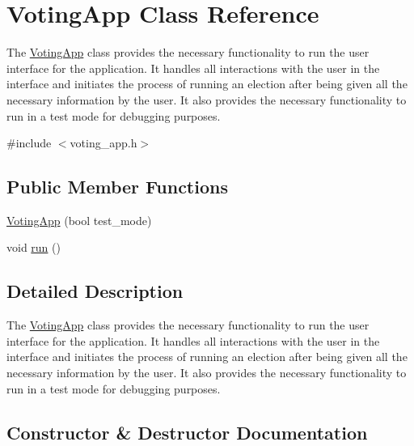\hypertarget{classVotingApp}{}\section{Voting\+App Class Reference}
\label{classVotingApp}


The \hyperlink{classVotingApp}{Voting\+App} class provides the necessary functionality to run the user interface for the application. It handles all interactions with the user in the interface and initiates the process of running an election after being given all the necessary information by the user. It also provides the necessary functionality to run in a test mode for debugging purposes.  




{\ttfamily \#include $<$voting\+\_\+app.\+h$>$}

\subsection*{Public Member Functions}
\begin{DoxyCompactItemize}
\item 
\hyperlink{classVotingApp_a23dbc45972a7246f7f4449c831af6c75}{Voting\+App} (bool test\+\_\+mode)
\item 
void \hyperlink{classVotingApp_a9d62b11e6082588a0b01752f838e0611}{run} ()
\end{DoxyCompactItemize}


\subsection{Detailed Description}
The \hyperlink{classVotingApp}{Voting\+App} class provides the necessary functionality to run the user interface for the application. It handles all interactions with the user in the interface and initiates the process of running an election after being given all the necessary information by the user. It also provides the necessary functionality to run in a test mode for debugging purposes. 

\subsection{Constructor \& Destructor Documentation}
\mbox{\label{classVotingApp_a23dbc45972a7246f7f4449c831af6c75}} 
